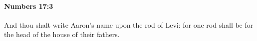 
		\paragraph{Numbers 17:3} %
			\label{NUMBERS-17-3}

			And thou shalt write Aaron’s name upon the rod of Levi: for one rod shall be for the head of the house of their fathers.


